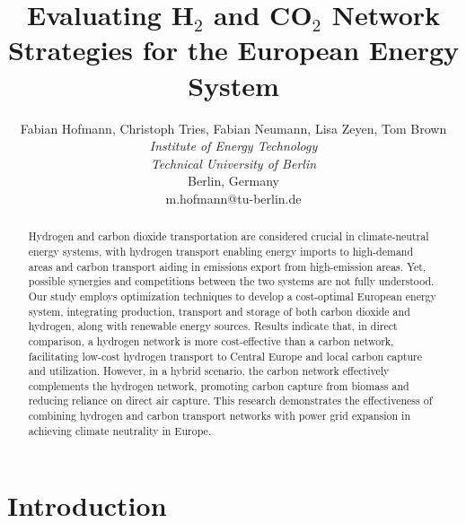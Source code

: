 \documentclass[twocolumn]{article}
\newcommand{\COtwo}{CO$_2$}
\newcommand{\Htwo}{H$_2$}
\begin{document}

\title{Evaluating \Htwo{} and \COtwo{} Network Strategies for the European Energy System}



\author{
    Fabian Hofmann, Christoph Tries, Fabian Neumann, Lisa Zeyen, Tom Brown \\
    \textit{Institute of Energy Technology} \\
    \textit{Technical University of Berlin}\\
    Berlin, Germany \\
    m.hofmann@tu-berlin.de
}


\maketitle

\begin{abstract}
    Hydrogen and carbon dioxide transportation are considered crucial in climate-neutral energy systems, with hydrogen transport enabling energy imports to high-demand areas and carbon transport aiding in emissions export from high-emission areas. Yet, possible synergies and competitions between the two systems are not fully understood. Our study employs optimization techniques to develop a cost-optimal European energy system, integrating production, transport and storage of both carbon dioxide and hydrogen, along with renewable energy sources. Results indicate that, in direct comparison, a hydrogen network is more cost-effective than a carbon network, facilitating low-cost hydrogen transport to Central Europe and local carbon capture and utilization. However, in a hybrid scenario, the carbon network effectively complements the hydrogen network, promoting carbon capture from biomass and reducing reliance on direct air capture. This research demonstrates the effectiveness of combining hydrogen and carbon transport networks with power grid expansion in achieving climate neutrality in Europe.
\end{abstract}

\section{Introduction}
\end{document}
